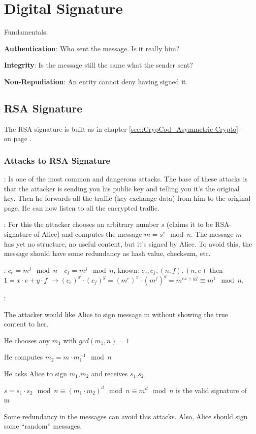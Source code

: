 
\section{Digital Signature}
Fundamentals:
\begin{liste}
  \item	\textbf{Authentication}: Who sent the message. Is it really him?
  \item \textbf{Integrity}: Is the message still the same what the sender sent?
  \item \textbf{Non-Repudiation}: An entity cannot deny having signed it.
\end{liste}


\subsection{RSA  Signature}
The RSA signature is built as in chapter \ref{sec::CrypCod_Asymmetric Crypto} -  on page \pageref{sec::CrypCod_Asymmetric Crypto}.

\subsubsection{Attacks to RSA Signature}

: 
Is one of the most common and dangerous attacks. The base of these attacks is that the attacker is sending you his public key and telling you it's the original key.
Then he forwards all the traffic (key exchange data) from him to the original page. 
He can now listen to all the encrypted traffic.

: For this the attacker chooses an arbitrary number $s$ (claims it to be RSA-signature of Alice) and computes the message $m=s^e\mod n$.
The message $m$ has yet no structure, no useful content, but it's signed by Alice.
To avoid this, the message should have some redundancy as hash value, checksum, etc.

: $c_e=m^f \mod n \quad c_f=m^f \mod n$, known: $c_e,c_f,(n,f),(n,e)$ then $1=x \cdot e + y \cdot f$
$\rightarrow (c_e)^x \cdot (c_f)^y=(m^e)^x \cdot (m^f)^y=m^{ex+yf} \equiv m^1 \mod n$.

:
\begin{aufzaehlung}
\item The attacker would like Alice to sign message m without showing the true content to her.
\item He chooses any $m_1$ with $gcd(m_1,n)=1$
\item He computes $m_2 = m \cdot m_1^{-1} \mod n$
\item He asks Alice to sign $m_1$,$m_2$ and receives $s_1$,$s_2$
\item $s=s_1 \cdot s_2 \mod n \equiv (m_1\cdot m_2)^d \mod n \equiv m^d \mod n$ is the valid signature of m
\end{aufzaehlung}
Some redundancy in the messages can avoid this attacks.
Also, Alice should sign some ``random'' messages.

